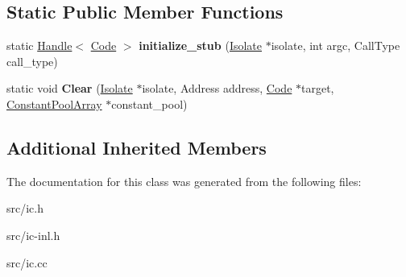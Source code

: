 \subsection*{Static Public Member Functions}
\begin{DoxyCompactItemize}
\item 
\hypertarget{classv8_1_1internal_1_1_call_i_c_a627b387e7ff68ffdcaa9739ea1648aaa}{}static \hyperlink{classv8_1_1internal_1_1_handle}{Handle}$<$ \hyperlink{classv8_1_1internal_1_1_code}{Code} $>$ {\bfseries initialize\+\_\+stub} (\hyperlink{classv8_1_1internal_1_1_isolate}{Isolate} $\ast$isolate, int argc, Call\+Type call\+\_\+type)\label{classv8_1_1internal_1_1_call_i_c_a627b387e7ff68ffdcaa9739ea1648aaa}

\item 
\hypertarget{classv8_1_1internal_1_1_call_i_c_a5ffce3305f7d0f67647a839be167a8b1}{}static void {\bfseries Clear} (\hyperlink{classv8_1_1internal_1_1_isolate}{Isolate} $\ast$isolate, Address address, \hyperlink{classv8_1_1internal_1_1_code}{Code} $\ast$target, \hyperlink{classv8_1_1internal_1_1_constant_pool_array}{Constant\+Pool\+Array} $\ast$constant\+\_\+pool)\label{classv8_1_1internal_1_1_call_i_c_a5ffce3305f7d0f67647a839be167a8b1}

\end{DoxyCompactItemize}
\subsection*{Additional Inherited Members}


The documentation for this class was generated from the following files\+:\begin{DoxyCompactItemize}
\item 
src/ic.\+h\item 
src/ic-\/inl.\+h\item 
src/ic.\+cc\end{DoxyCompactItemize}
